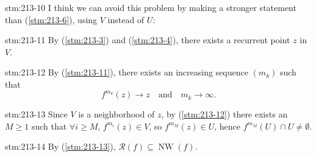 \begin{explanation}{stm:213-10}
I think we can avoid this problem by making a stronger statement than (\ref{stm:213-6}), using $V$ instead of $U$:
\end{explanation}

\begin{statement}{stm:213-11}
By (\ref{stm:213-3}) and (\ref{stm:213-4}), there exists a recurrent point $z$ in $V$.
\end{statement}

\begin{statement}{stm:213-12}
By (\ref{stm:213-11}), there exists an increasing sequence $(m_k)$ such that 
\[
f^{m_k}(z) \to z \quad \text{and} \quad m_k \to \infty.
\]
\end{statement}

\begin{statement}{stm:213-13}
Since $V$ is a neighborhood of $z$, by (\ref{stm:213-12}) there exists an $M \geq 1$ such that $\forall i \geq M$, $f^{m_i}(z) \in V$, so $f^{m_M}(z) \in U$, hence $f^{m_M}(U) \cap U \neq \emptyset$.
\end{statement}

\begin{statement}{stm:213-14}
By (\ref{stm:213-13}), $\mathcal{R}(f) \subseteq \operatorname{NW}(f)$.
\end{statement}
